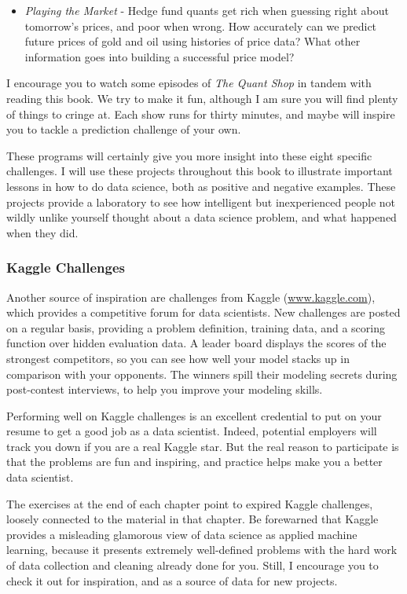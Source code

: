 \documentclass[10pt]{article}
\begin{document}
\begin{itemize}
  \item \emph{Playing the Market} - Hedge fund quants get rich when guessing right about tomorrow's prices, and poor when wrong. How accurately can we predict future prices of gold and oil using histories of price data? What other information goes into building a successful price model?
\end{itemize}

I encourage you to watch some episodes of \emph{The Quant Shop} in tandem with reading this book. We try to make it fun, although I am sure you will find plenty of things to cringe at. Each show runs for thirty minutes, and maybe will inspire you to tackle a prediction challenge of your own.

These programs will certainly give you more insight into these eight specific challenges. I will use these projects throughout this book to illustrate important lessons in how to do data science, both as positive and negative examples. These projects provide a laboratory to see how intelligent but inexperienced people not wildly unlike yourself thought about a data science problem, and what happened when they did.

\subsubsection{Kaggle Challenges}
Another source of inspiration are challenges from Kaggle (\href{http://www.kaggle.com}{www.kaggle.com}), which provides a competitive forum for data scientists. New challenges are posted on a regular basis, providing a problem definition, training data, and a scoring function over hidden evaluation data. A leader board displays the scores of the strongest competitors, so you can see how well your model stacks up in comparison with your opponents. The winners spill their modeling secrets during post-contest interviews, to help you improve your modeling skills.

Performing well on Kaggle challenges is an excellent credential to put on your resume to get a good job as a data scientist. Indeed, potential employers will track you down if you are a real Kaggle star. But the real reason to participate is that the problems are fun and inspiring, and practice helps make you a better data scientist.

The exercises at the end of each chapter point to expired Kaggle challenges, loosely connected to the material in that chapter. Be forewarned that Kaggle provides a misleading glamorous view of data science as applied machine learning, because it presents extremely well-defined problems with the hard work of data collection and cleaning already done for you. Still, I encourage you to check it out for inspiration, and as a source of data for new projects.
\end{document}
